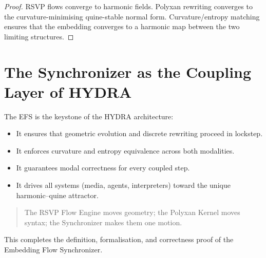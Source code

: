 \begin{proof}
RSVP flows converge to harmonic fields.
Polyxan rewriting converges to the curvature-minimising quine-stable normal
form.  
Curvature/entropy matching ensures that the embedding converges to a harmonic
map between the two limiting structures.
\end{proof}

\section{The Synchronizer as the Coupling Layer of HYDRA}

The EFS is the keystone of the HYDRA architecture:

\begin{itemize}
\item It ensures that geometric evolution and discrete rewriting proceed in
      lockstep.
\item It enforces curvature and entropy equivalence across both modalities.
\item It guarantees modal correctness for every coupled step.
\item It drives all systems (media, agents, interpreters) toward the unique
      harmonic–quine attractor.
\end{itemize}

\begin{quote}
The RSVP Flow Engine moves geometry;  
the Polyxan Kernel moves syntax;  
the Synchronizer makes them one motion.
\end{quote}

This completes the definition, formalisation, and correctness proof of the
Embedding Flow Synchronizer.

